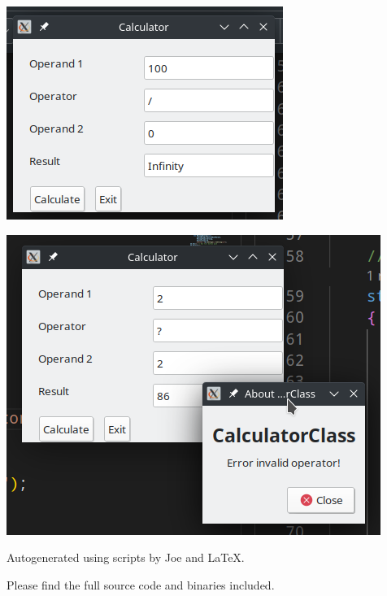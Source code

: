 \documentclass[12pt]{article}
\begin{document}
\includegraphics{Ex4}

\includegraphics{Ex5}

\newpage

Autogenerated using scripts by Joe and \LaTeX.

Please find the full source code and binaries included.
\end{document}
